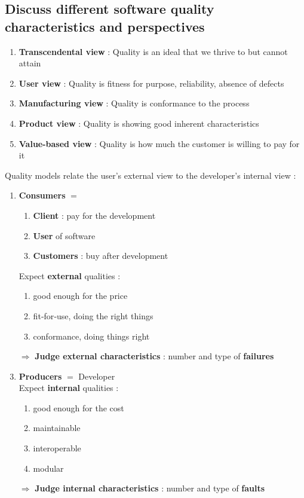 \documentclass{article}
\begin{document}
\subsection{Discuss different software quality characteristics and perspectives}
\begin{enumerate}
    \item \textbf{Transcendental view} : Quality is an ideal that we thrive to but cannot attain
    \item \textbf{User view} : Quality
is
fitness
for
purpose,
reliability,
absence
of
defects
    \item \textbf{Manufacturing view} : Quality
is
conformance
to
the
process
    \item \textbf{Product view} : Quality
is
showing
good
inherent
characteristics
    \item \textbf{Value-based view} : Quality is how much the customer is willing to pay for it
\end{enumerate}
\vspace{0.3cm}
\noindent Quality
models
relate
the
user's
external
view
to
the
developer's
internal
view :

\begin{enumerate}
\item \textbf{Consumers} $=$
    \begin{enumerate}
        \item \textbf{Client} : pay for the development
        \item \textbf{User} of software
        \item \textbf{Customers} : buy  after development
    \end{enumerate}
    Expect \textbf{external} qualities : 
    \begin{enumerate}
        \item good enough for the price
        \item fit‐for‐use, doing the right things
        \item conformance, doing things right
    \end{enumerate}
    \item[$\Rightarrow$] \textbf{Judge external characteristics} : number and type of \textbf{failures}
    
    \item \textbf{Producers} $=$ Developer
    \\ Expect \textbf{internal} qualities : 
    \begin{enumerate}
        \item good enough for the cost
        \item maintainable
        \item interoperable
        \item modular
    \end{enumerate}
     \item[$\Rightarrow$] \textbf{Judge internal characteristics} : number and type of \textbf{faults}
\end{enumerate}
\end{document}
